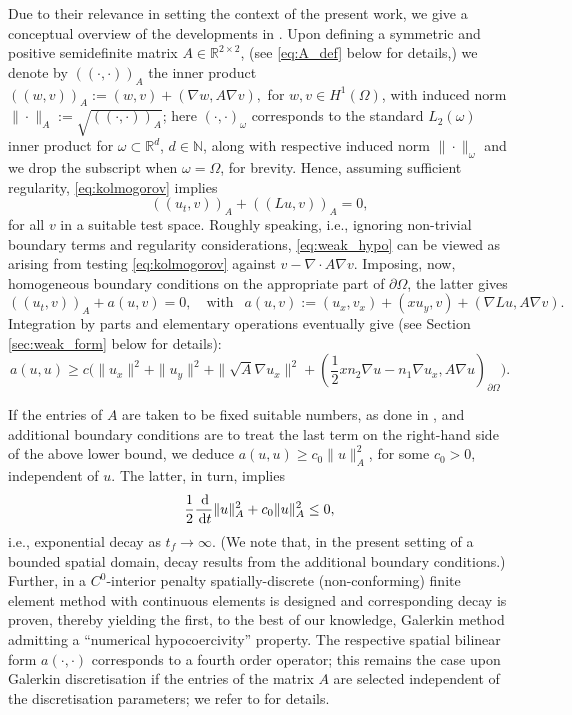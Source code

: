 \documentclass{amsart}
\newcommand{\norm}[2]{\|{#1}\|_{{#2}}}
\newcommand{\ud}{\,{\rm d}}
\newcommand{\Ainner}[2]{(\!({#1},{#2})\!)_A}
\theoremstyle{definition}
\theoremstyle{remark}
\numberwithin{equation}{section}
\begin{document}
 Due to their relevance in setting the context of the present work, we give a conceptual overview of the developments in \cite{georgoulis,  DonGeoHer24}.
	 {Upon defining a} symmetric and positive semidefinite matrix $A\in \mathbb{R}^{2\times 2}$,  {(see \eqref{eq:A_def} below for details,)} we denote by $\Ainner{\cdot}{\cdot}$ the inner product
$
	\Ainner{w}{v}:=(w,v)+ (\nabla w,A\nabla v ),
	$
	for $w,v\in H^1(\Omega)$, with induced norm $\norm{\cdot}{A}:= \sqrt{\Ainner{\cdot}{\cdot}}$; here $(\cdot,\cdot)_{\omega}$ corresponds to the standard $L_2(\omega)$ inner product for $\omega\subset \mathbb{R}^d$, $d\in\mathbb{N}$, along with respective induced norm $\|\cdot \|_\omega$ and we drop the subscript when $\omega=\Omega$, for brevity. Hence, assuming sufficient regularity, \eqref{eq:kolmogorov} implies
		\begin{equation}\label{eq:weak_hypo}
		\Ainner{u_t}{v}+ \Ainner{L u}{v}		=0,
	\end{equation} for all $v$ in  {a} suitable test space.  {Roughly speaking, i.e., ignoring non-trivial boundary terms and regularity considerations, \eqref{eq:weak_hypo} can be viewed as arising from testing \eqref{eq:kolmogorov} against $v-\nabla\cdot A\nabla v$.}
Imposing, now, homogeneous boundary conditions on the appropriate part of $\partial\Omega$,  the latter gives
	\begin{equation}\label{eq:weak_bilinear}
		\Ainner{u_t}{v} + a(u,v) =0, \quad\text{with }\ \ 	a(u,v):=(u_x,v_x)+(xu_y,v)+(\nabla L u, A\nabla v).
	\end{equation}
	Integration by parts  and elementary operations eventually give (see Section \ref{sec:weak_form} below for details):
		\begin{equation}\label{eq:hypoco3old}
			a(u,u)
		 \ge   c \Big(  \|u_x\|^2
			+
			 \|u_y\|^2
			+ \norm{\sqrt{A}\nabla u_x}{}^2			+(\frac{1}{2}xn_2\nabla u-n_1\nabla u_{x}, A\nabla u)_{\partial\Omega}\Big).
	\end{equation}


	If the  {entries} of $A$ are  taken to be fixed suitable numbers, as done in  \cite{georgoulis}, and additional boundary conditions are to treat the last term on the right-hand side of the above lower bound, we deduce
	$
		a(u,u)\ge   c_0 \norm{u}{A}^2
	$,
for some $c_0>0$, independent of $u$. The latter, in turn, implies
		\[
\frac{1}{2}	\frac{\ud }{\ud t } \norm{u}{A}^2+  c_0 \norm{u}{A}^2\le 0,
	\]
	i.e., exponential decay as $t_f\to\infty$. (We note that, in the present setting of a bounded spatial domain, decay results from the additional boundary conditions.) Further, in  \cite{georgoulis} a  {$C^0$-interior penalty} spatially-discrete (non-conforming) finite element method with continuous elements is designed and corresponding decay is proven, thereby yielding the first, to the best of our knowledge, Galerkin method admitting a ``numerical hypocoercivity'' property. The respective spatial bilinear form $a(\cdot,\cdot)$ corresponds to a fourth order operator; this remains the case upon Galerkin discretisation  {if the entries of the matrix $A$ are selected independent of the discretisation parameters}; we refer to \cite{georgoulis} for details.
\end{document}
